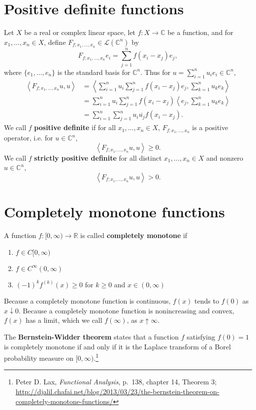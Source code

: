 \documentclass{article}
\newcommand{\inner}[2]{\left\langle #1, #2 \right\rangle}
\theoremstyle{definition}
\begin{document}
\section{Positive definite functions}
Let $X$ be a real or complex linear space, let  $f:X \to \mathbb{C}$ be a function, and for
$x_1,\ldots,x_n \in X$, define $F_{f;x_1,\ldots,x_n} \in \mathscr{L}(\mathbb{C}^n)$ by
\[
F_{f;x_1,\ldots,x_n}e_i = \sum_{j=1}^n f(x_i-x_j) e_j,
\]
where $\{e_1,\ldots,e_n\}$ is the standard basis for $\mathbb{C}^n$.
 Thus for
$u=\sum_{i=1}^n u_i e_i \in \mathbb{C}^n$,
\begin{align*}
\inner{F_{f;x_1,\ldots,x_n}u}{u}&=\inner{\sum_{i=1}^n u_i \sum_{j=1}^n f(x_i-x_j) e_j}{\sum_{k=1}^n u_k e_k}\\
&=\sum_{i=1}^n u_i \sum_{j=1}^n f(x_i-x_j) \inner{e_j}{\sum_{k=1}^n u_k e_k}\\
&=\sum_{i=1}^n  \sum_{j=1}^n u_i \overline{u_j} f(x_i-x_j).
\end{align*}
We call $f$  \textbf{positive definite} if
for all $x_1,\ldots,x_n \in X$,
$F_{f;x_1,\ldots,x_n}$ is a positive operator, i.e. for
 $u \in \mathbb{C}^n$,
\[
\inner{F_{f;x_1,\ldots,x_n}u}{u} \geq 0.
\]
We call $f$
\textbf{strictly positive definite} for all distinct $x_1,\ldots,x_n \in X$ and nonzero $u \in \mathbb{C}^n$,
\[
\inner{F_{f;x_1,\ldots,x_n}u}{u} >0.
\]


\section{Completely monotone functions}
A function $f:[0,\infty) \to \mathbb{R}$ is called \textbf{completely monotone} if
\begin{enumerate}
\item $f \in C[0,\infty)$
\item $f \in C^\infty(0,\infty)$
\item $(-1)^k f^{(k)}(x) \geq 0$ for $k \geq 0$ and $x \in (0,\infty)$
\end{enumerate}
Because a completely monotone function is continuous, $f(x)$ tends to $f(0)$ as  $x \downarrow 0$.
Because a completely monotone function is nonincreasing and convex, 
$f(x)$ has a limit, which we call $f(\infty)$, as $x \uparrow \infty$. 

The \textbf{Bernstein-Widder theorem} states that a function $f$ satisfying
$f(0)=1$ is completely monotone if and only
if it is the Laplace transform of a Borel probability measure on $[0,\infty)$.\footnote{Peter D. Lax, {\em Functional Analysis}, p.~138, chapter 14, Theorem 3;
\url{http://djalil.chafai.net/blog/2013/03/23/the-bernstein-theorem-on-completely-monotone-functions/}}
\end{document}
